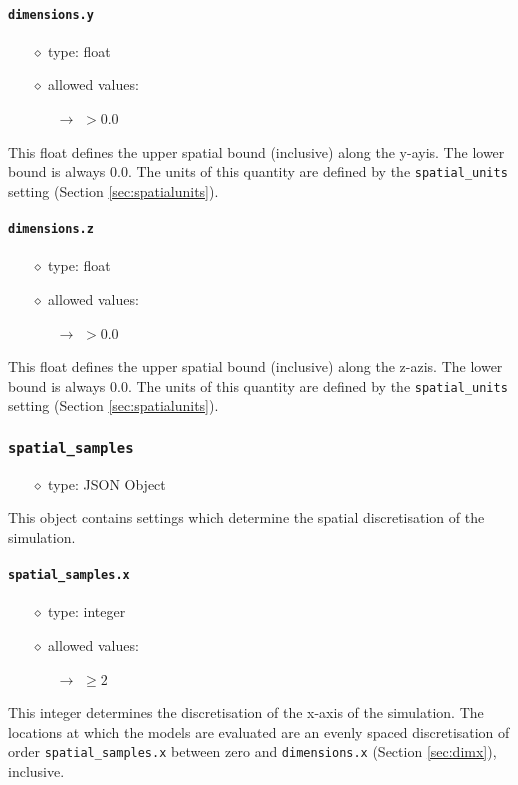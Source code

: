 \documentclass[]{article}
\def\code#1{\texttt{#1}}
\begin{document}
\paragraph{\code{dimensions.y}}\label{sec:dimy}
\begin{itemize}
    \item[$\diamond$] type: float 
    \item[$\diamond$] allowed values:
    \begin{itemize}
        \item[$\rightarrow$] $>0.0$
    \end{itemize}
\end{itemize}
This float defines the upper spatial bound (inclusive) along the y-ayis. The
lower bound is always 0.0. The units of this quantity are defined by the
\code{spatial\_units} setting (Section \ref{sec:spatialunits}).

\paragraph{\code{dimensions.z}}\label{sec:dimz}
\begin{itemize}
    \item[$\diamond$] type: float 
    \item[$\diamond$] allowed values:
    \begin{itemize}
        \item[$\rightarrow$] $>0.0$
    \end{itemize}
\end{itemize}
This float defines the upper spatial bound (inclusive) along the z-azis. The
lower bound is always 0.0. The units of this quantity are defined by the
\code{spatial\_units} setting (Section \ref{sec:spatialunits}).

\subsubsection{\code{spatial\_samples}}
\begin{itemize}
    \item[$\diamond$] type: JSON Object 
\end{itemize}
This object contains settings which determine the spatial discretisation of the
simulation.

\paragraph{\code{spatial\_samples.x}}
\begin{itemize}
    \item[$\diamond$] type: integer 
    \item[$\diamond$] allowed values:
    \begin{itemize}
        \item[$\rightarrow$] $\geq2$
    \end{itemize}
\end{itemize}
This integer determines the discretisation of the x-axis of the simulation. The
locations at which the models are evaluated are an evenly spaced discretisation
of order \code{spatial\_samples.x} between zero and \code{dimensions.x} (Section
\ref{sec:dimx}), inclusive.
\end{document}
